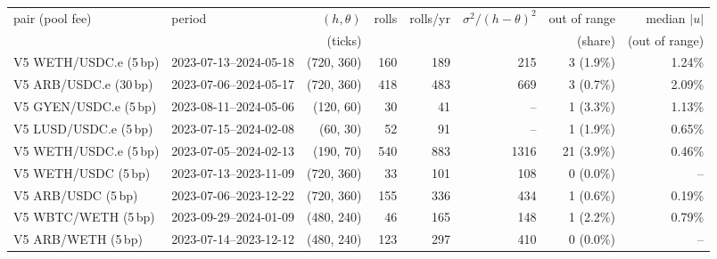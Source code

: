 \begin{tabular}{llrrrrrr}
\toprule
pair (pool fee) & period & $(h,\theta)$ & rolls & rolls/yr & $\sigma^2/(h-\theta)^2$ & out of range & median $|u|$ \\
 & & (ticks) & & & & (share) & (out of range) \\
\midrule
V5 WETH/USDC.e (5\,bp) & 2023-07-13--2024-05-18 & (720, 360) & 160 & 189 & 215 & 3 (1.9\%) & 1.24\% \\
V5 ARB/USDC.e (30\,bp) & 2023-07-06--2024-05-17 & (720, 360) & 418 & 483 & 669 & 3 (0.7\%) & 2.09\% \\
V5 GYEN/USDC.e (5\,bp) & 2023-08-11--2024-05-06 & (120, 60) & 30 & 41 & -- & 1 (3.3\%) & 1.13\% \\
V5 LUSD/USDC.e (5\,bp) & 2023-07-15--2024-02-08 & (60, 30) & 52 & 91 & -- & 1 (1.9\%) & 0.65\% \\
V5 WETH/USDC.e (5\,bp) & 2023-07-05--2024-02-13 & (190, 70) & 540 & 883 & 1316 & 21 (3.9\%) & 0.46\% \\
V5 WETH/USDC (5\,bp) & 2023-07-13--2023-11-09 & (720, 360) & 33 & 101 & 108 & 0 (0.0\%) & -- \\
V5 ARB/USDC (5\,bp) & 2023-07-06--2023-12-22 & (720, 360) & 155 & 336 & 434 & 1 (0.6\%) & 0.19\% \\
V5 WBTC/WETH (5\,bp) & 2023-09-29--2024-01-09 & (480, 240) & 46 & 165 & 148 & 1 (2.2\%) & 0.79\% \\
V5 ARB/WETH (5\,bp) & 2023-07-14--2023-12-12 & (480, 240) & 123 & 297 & 410 & 0 (0.0\%) & -- \\
\bottomrule
\end{tabular}

